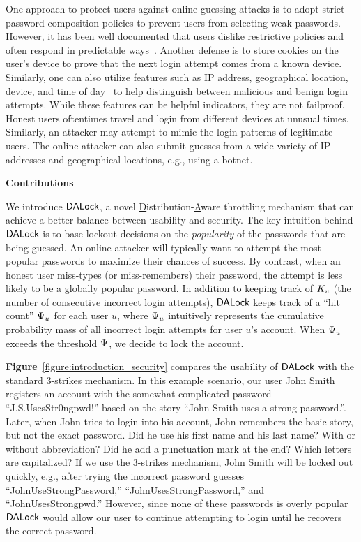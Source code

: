 One approach to protect users against online guessing attacks is to adopt strict password composition policies to prevent users from selecting weak passwords. However, it has been well documented that users dislike restrictive policies and often respond in predictable ways~\cite{KSKMBCCE:SIGCHI11}. Another defense is to store cookies on the user's device to prove that the next login attempt comes from a known device. Similarly, one can also utilize features such as IP address, geographical location, device, and time of day~\cite{sandhu2005system,NDSS:FJDBG16} to help distinguish between malicious and benign login attempts. While these features can be helpful indicators, they are not failproof. Honest users oftentimes travel and login from different devices at unusual times. Similarly, an attacker may attempt to mimic the login patterns of legitimate users. The online attacker can also submit guesses from a wide variety of IP addresses and geographical locations, e.g., using a botnet. 




\vspace{-0.1cm}


{\noindent \bf {Contributions}} 


We introduce $\mathsf{DALock}$, a novel \underline{D}istribution-\underline{A}ware throttling mechanism that can achieve a better balance between usability and security. The key intuition behind $\mathsf{DALock}$ is to base lockout decisions on the {\em popularity} of the passwords that are being guessed. An online attacker will typically want to attempt the most popular passwords to maximize their chances of success. By contrast, when an honest user miss-types (or miss-remembers) their password, the attempt is less likely to be a globally popular password. In addition to keeping track of $K_{u}$ (the number of consecutive incorrect login attempts), $\mathsf{DALock}$ keeps track of a ``hit count'' $\Psi_{u}$ for each user $u$, where $\Psi_{u}$ intuitively represents the cumulative probability mass of all incorrect login attempts for user $u$'s account. When $\Psi_{u}$ exceeds the threshold $\Psi$, we decide to lock the account. 

 \textbf{Figure}~\ref{figure:introduction_security} compares the usability of $\mathsf{DALock}$ with the standard 3-strikes mechanism. In this example scenario, our user John Smith registers an account with the somewhat complicated password ``J.S.UsesStr0ngpwd!'' based on the story ``John Smith uses a strong password.''. Later, when John tries to login into his account, John remembers the basic story, but not the exact password. Did he use his first name and his last name? With or without abbreviation? Did he add a punctuation mark at the end? Which letters are capitalized? If we use the 3-strikes mechanism, John Smith will be locked out quickly, e.g., after trying the incorrect password guesses ``JohnUseStrongPassword,'' ``JohnUsesStrongPassword,'' and ``JohnUsesStrongpwd.'' However, since none of these passwords is overly popular $\mathsf{DALock}$ would allow our user to continue attempting to login until he recovers the correct password. 



